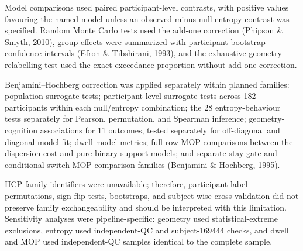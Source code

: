\documentclass[12pt,a4paper]{report}
\begin{document}
Model comparisons used paired participant-level contrasts, with positive values favouring the named model unless an observed-minus-null entropy contrast was specified. Random Monte Carlo tests used the add-one correction (Phipson \& Smyth, 2010), group effects were summarized with participant bootstrap confidence intervals (Efron \& Tibshirani, 1993), and the exhaustive geometry relabelling test used the exact exceedance proportion without add-one correction.





Benjamini--Hochberg correction was applied separately within planned families: population surrogate tests; participant-level surrogate tests across 182 participants within each null/entropy combination; the 28 entropy-behaviour tests separately for Pearson, permutation, and Spearman inference; geometry-cognition associations for 11 outcomes, tested separately for off-diagonal and diagonal model fit; dwell-model metrics; full-row MOP comparisons between the dispersion-cost and pure binary-support models; and separate stay-gate and conditional-switch MOP comparison families (Benjamini \& Hochberg, 1995).

HCP family identifiers were unavailable; therefore, participant-label permutations, sign-flip tests, bootstraps, and subject-wise cross-validation did not preserve family exchangeability and should be interpreted with this limitation. Sensitivity analyses were pipeline-specific: geometry used statistical-extreme exclusions, entropy used independent-QC and subject-169444 checks, and dwell and MOP used independent-QC samples identical to the complete sample.
\end{document}
